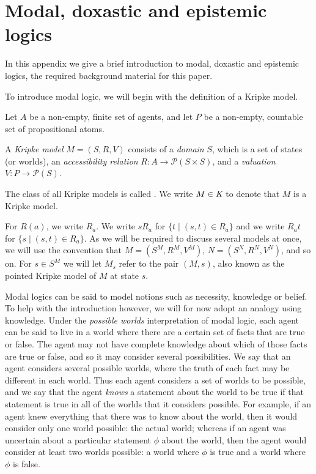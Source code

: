 \chapter{Modal, doxastic and epistemic logics}\label{modal}

In this appendix we give a brief introduction to modal, doxastic and epistemic
logics, the required background material for this paper.

To introduce modal logic, we will begin with the definition of a Kripke model.

Let $A$ be a non-empty, finite set of agents, and let $P$ be a non-empty,
countable set of propositional atoms.

\begin{definition}
A \textit{Kripke model} $M = (S, R, V)$ consists of a \textit{domain} $S$, which
is a set of states (or worlds), an \textit{accessibility relation} $R : A \to
\mathcal{P}(S \times S)$, and a \textit{valuation} $V : P \to \mathcal{P}(S)$. 

The class of all Kripke models is called \classK{}. We write $M \in \textit{K}{}$
to denote that $M$ is a Kripke model.
\end{definition}

For $R(a)$, we write $R_a$. We write $sR_a$ for $\{t \mid (s, t) \in R_a\}$ and
we write $R_at$ for $\{s \mid (s, t) \in R_a\}$. As we will be required to
discuss several models at once, we will use the convention that $M = (S^M, R^M,
V^M)$, $N = (S^N, R^N, V^N)$, and so on. For $s \in S^M$ we will let $M_s$ refer
to the pair $(M, s)$, also known as the pointed Kripke model of $M$ at state
$s$.

Modal logics can be said to model notions such as necessity, knowledge or
belief. To help with the introduction however, we will for now adopt an analogy
using knowledge. Under the {\em possible worlds} interpretation of modal logic,
each agent can be said to live in a world where there are a certain set of facts
that are true or false. The agent may not have complete knowledge about which of
those facts are true or false, and so it may consider several possibilities. We
say that an agent considers several possible worlds, where the truth of each
fact may be different in each world. Thus each agent considers a set of worlds
to be possible, and we say that the agent {\em knows} a statement about the
world to be true if that statement is true in all of the worlds that it
considers possible. For example, if an agent knew everything that there was to
know about the world, then it would consider only one world possible: the actual
world; whereas if an agent was uncertain about a particular statement $\phi$
about the world, then the agent would consider at least two worlds possible: a
world where $\phi$ is true and a world where $\phi$ is false.

